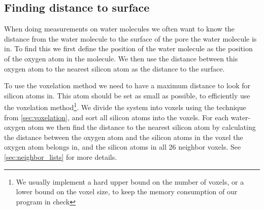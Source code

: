 \subsection{Finding distance to surface\label{sec:find_distance_to_surface}}
When doing measurements on water molecules we often want to know the distance from the water molecule to the surface of the pore the water molecule is in. To find this we first define the position of the water molecule as the position of the oxygen atom in the molecule. We then use the distance between this oxygen atom to the nearest silicon atom as the distance to the surface.

To use the voxelation method we need to have a maximum distance to look for silicon atoms in. This atom should be set as small as possible, to efficiently use the voxelation method\footnote{We usually implement a hard upper bound on the number of voxels, or a lower bound on the voxel size, to keep the memory consumption of our program in check}. We divide the system into voxels using the technique from \cref{sec:voxelation}, and sort all silicon atoms into the voxels. For each water-oxygen atom we then find the distance to the nearest silicon atom by calculating the distance between the oxygen atom and the silicon atoms in the voxel the oxygen atom belongs in, and the silicon atoms in all 26 neighbor voxels. See \cref{sec:neighbor_lists} for more details.

\FloatBarrier
